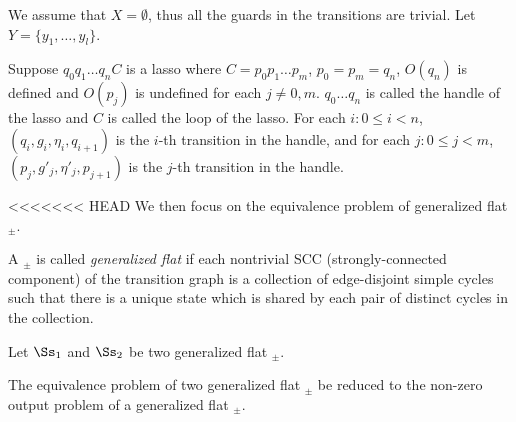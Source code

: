 We assume that $X=\emptyset$, thus all the guards in the transitions are trivial. Let $Y=\{y_1,\dots,y_l\}$.

Suppose $q_0 q_1 \dots q_n C$ is a lasso where $C=p_0 p_1 \dots p_m$, $p_0 = p_m=q_n$, $O(q_n)$ is defined and $O(p_j)$ is undefined for each $j \neq 0,m$. $q_0 \dots q_n$ is called the handle of the lasso and $C$ is called the loop of the lasso. For each $i: 0 \le i < n$, $(q_i, g_i, \eta_i, q_{i+1})$ is the $i$-th transition in the handle, and for each $j: 0 \le j < m$, $(p_j, g'_j, \eta'_j, p_{j+1})$ is the $j$-th transition in the handle. 

<<<<<<< HEAD
We then focus on the equivalence problem of generalized flat \SDSIT$_{\pm}$.

A \SDSIT$_{\pm}$ is called \emph{generalized flat} if each nontrivial SCC (strongly-connected component) of the transition graph is a collection of edge-disjoint simple cycles such that there is a unique state which is shared by each pair of distinct cycles in the collection.

Let $\Ss_1$ and $\Ss_2$ be two generalized flat \SDSIT$_{\pm}$.

\begin{proposition}\label{prop-equiv-reduce}
The equivalence problem of two generalized flat \SDSIT$_{\pm}$ be reduced to the non-zero output problem of a generalized flat \SDSIT$_{\pm}$.
\end{proposition}



